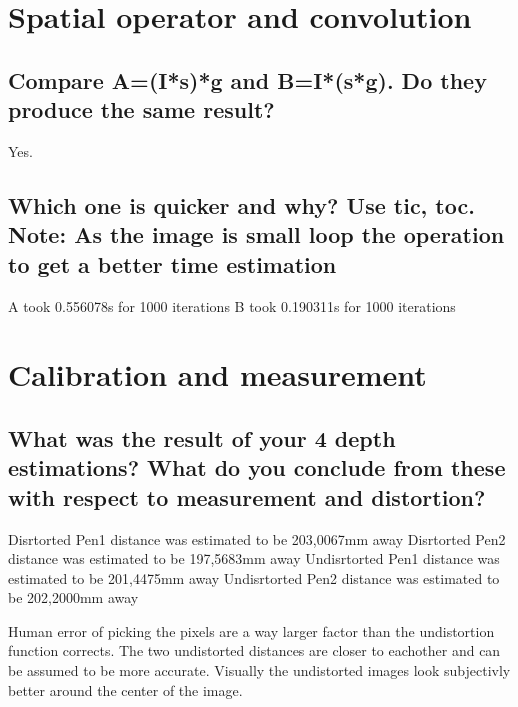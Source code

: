 \section{Spatial operator and convolution}
\subsection{Compare A=(I*s)*g and B=I*(s*g). Do they produce the same result?}
Yes.
\subsection{Which one is quicker and why? Use tic, toc. Note: As the image is small loop the operation to get a better time estimation}
A took 0.556078s for 1000 iterations
B took 0.190311s for 1000 iterations
\section{Calibration and measurement}
\subsection{What was the result of your 4 depth estimations? What do you conclude from these with respect to measurement and distortion?}
Disrtorted Pen1 distance was estimated to be 203,0067mm away
Disrtorted Pen2 distance was estimated to be 197,5683mm away
Undisrtorted Pen1 distance was estimated to be 201,4475mm away
Undisrtorted Pen2 distance was estimated to be 202,2000mm away

Human error of picking the pixels are a way larger factor than the undistortion function corrects. The two undistorted distances are closer to eachother and can be assumed to be more accurate. Visually the undistorted images look subjectivly better around the center of the image.
